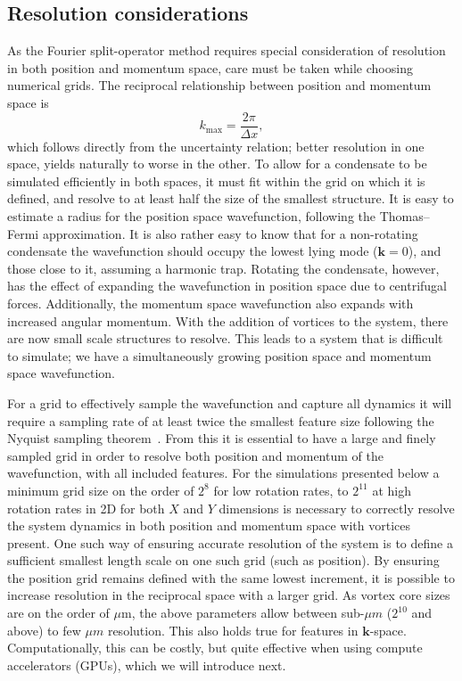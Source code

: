 \subsection{Resolution considerations}
As the Fourier split-operator method requires special consideration of resolution in both position and momentum space, care must be taken while choosing numerical grids. The reciprocal relationship between position and momentum space is \begin{equation}
    k_{\text{max}} = \frac{2\pi}{\Delta x},
\end{equation}
which follows directly from the uncertainty relation; better resolution in one space, yields naturally to worse in the other. To allow for a condensate to be simulated efficiently in both spaces, it must fit within the grid on which it is defined, and resolve to at least half the size of the smallest structure. It is easy to estimate a radius for the position space wavefunction, following the Thomas--Fermi approximation. It is also rather easy to know that for a non-rotating condensate the wavefunction should occupy the lowest lying mode ($\mathbf{k}=0$), and those close to it, assuming a harmonic trap. Rotating the condensate, however, has the effect of expanding the wavefunction in position space due to centrifugal forces. Additionally, the momentum space wavefunction also expands with increased angular momentum. With the addition of vortices to the system, there are now small scale structures to resolve. This leads to a system that is difficult to simulate; we have a simultaneously growing position space and momentum space wavefunction.

For a grid to effectively sample the wavefunction and capture all dynamics it will require a sampling rate of at least twice the smallest feature size following the Nyquist sampling theorem~\cite{BK:NumRecipes}. From this it is essential to have a large and finely sampled grid in order to resolve both position and momentum of the wavefunction, with all included features. For the simulations presented below a minimum grid size on the order of $2^8$ for low rotation rates, to $2^{11}$ at high rotation rates in 2D for both $X$ and $Y$ dimensions is necessary to correctly resolve the system dynamics in both position and momentum space with vortices present. One such way of ensuring accurate resolution of the system is to define a sufficient smallest length scale on one such grid (such as position). By ensuring the position grid remains defined with the same lowest increment, it is possible to increase resolution in the reciprocal space with a larger grid. As vortex core sizes are on the order of $\mu$m, the above parameters allow between sub-$\mu m$ ($2^{10}$ and above) to few $\mu m$ resolution. This also holds true for features in $\mathbf{k}$-space. Computationally, this can be costly, but quite effective when using compute accelerators (GPUs), which we will introduce next. %
